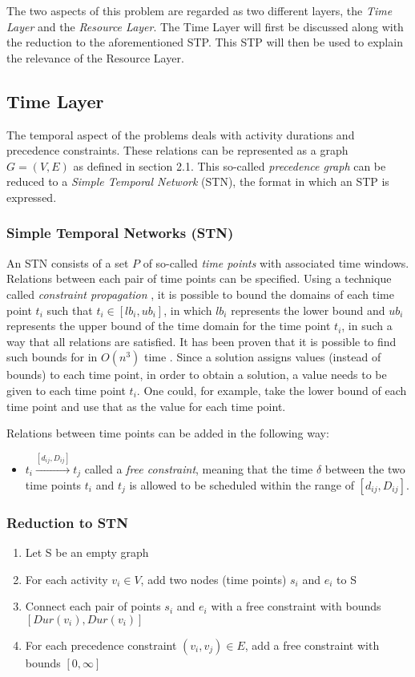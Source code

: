 \documentclass{article}
\newcommand{\dur}[1]{\textit{Dur}(#1)} %
\begin{document}
The two aspects of this problem are regarded as two different layers, the \emph{Time Layer} and the \emph{Resource Layer}.
The Time Layer will first be discussed along with the reduction to the aforementioned STP. 
This STP will then be used to explain the relevance of the Resource Layer.

\subsection{Time Layer}
The temporal aspect of the problems deals with activity durations and precedence constraints.
These relations can be represented as a graph $G=(V,E)$ as defined in section 2.1. 
This so-called \emph{precedence graph} can be reduced to a \emph{Simple Temporal Network} (STN), the format in which an STP is expressed.

\subsubsection{Simple Temporal Networks (STN)}
An STN consists of a set $P$ of so-called \emph{time points} with associated time windows.
Relations between each pair of time points can be specified.
Using a technique called \emph{constraint propagation} \cite{policella07}, it is possible to bound the domains of each time point $t_i$ such that $t_i \in [lb_i, ub_i]$, in which $lb_i$ represents the lower bound and $ub_i$ represents the upper bound of the time domain for the time point $t_i$, in such a way that all relations are satisfied.
It has been proven that it is possible to find such bounds for in $O(n^3)$ time \cite{policella07}.
Since a solution assigns values (instead of bounds) to each time point, in order to obtain a solution, a value needs to be given to each time point $t_i$.
One could, for example, take the lower bound of each time point and use that as the value for each time point.

Relations between time points can be added in the following way:
\begin{itemize}
\item $t_i \xrightarrow{[d_{ij},D_{ij}]} t_j$ called a \emph{free constraint}, meaning that the time $\delta$ between the two time points $t_i$ and $t_j$ is allowed to be scheduled within the range of $[d_{ij},D_{ij}]$.
\end{itemize}

\subsubsection{Reduction to STN}
\begin{enumerate}
\item Let S be an empty graph
\item For each activity $v_i \in V$, add two nodes (time points) $s_i$ and $e_i$ to S
\item Connect each pair of points $s_i$ and $e_i$ with a free constraint with bounds $[\dur{v_i}, \dur{v_i}]$
\item For each precedence constraint $(v_i, v_j) \in E$, add a free constraint with bounds $[0, \infty]$
\end{enumerate}
\end{document}

